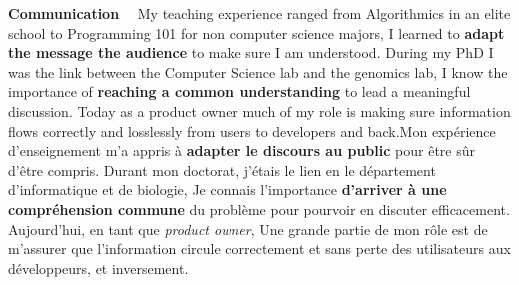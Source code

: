 \documentclass[a4paper]{article}
\newcommand\enfr[2]{\ifdefined\doen#1\else#2\fi\xspace}
\newcommand\sideentry[1]{\normalsize\textbf{#1}~~}
\begin{document}
\begin{minipage}[t]{0.29\textwidth}
    \sideentry{Communication}
    \enfr{My teaching experience ranged from
  Algorithmics in an elite school to Programming 101 for non computer
  science majors, I learned to \textbf{adapt the message the audience}
  to make sure I am understood.  During my PhD I was the link between
  the Computer Science lab and the genomics lab, I know the importance
  of \textbf{reaching a common understanding} to lead a meaningful
  discussion. Today as a product owner much of my role is making sure
  information flows correctly and losslessly from users to developers
  and back.}
  {Mon expérience d'enseignement m'a appris à \textbf{adapter le
      discours au public} pour être sûr d'être compris. Durant mon
    doctorat, j'étais le lien en le département d'informatique et de
    biologie, Je connais l'importance \textbf{d'arriver à une
      compréhension commune} du problème pour pourvoir en discuter
    efficacement. Aujourd'hui, en tant que \textit{product owner}, Une
    grande partie de mon rôle est de m'assurer que l'information
    circule correctement et sans perte des utilisateurs aux
    développeurs, et inversement.}\\
 
\end{minipage}
\end{document}
